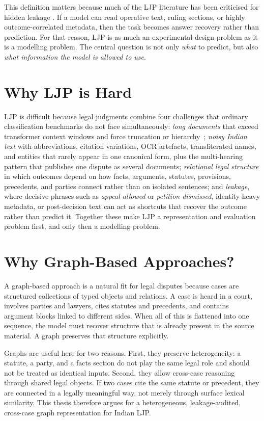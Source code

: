 This definition matters because much of the LJP literature has been criticised for hidden leakage \cite{medvedeva2023doitright}. If a model can read operative text, ruling sections, or highly outcome-correlated metadata, then the task becomes answer recovery rather than prediction. For that reason, LJP is as much an experimental-design problem as it is a modelling problem. The central question is not only \emph{what} to predict, but also \emph{what information the model is allowed to use}. 

\section{Why LJP is Hard}

LJP is difficult because legal judgments combine four challenges that ordinary classification benchmarks do not face simultaneously: \emph{long documents} that exceed transformer context windows and force truncation or hierarchy~\cite{chalkidis2020legalbert, mamakas2022longlegal}; \emph{noisy Indian text} with abbreviations, citation variations, OCR artefacts, transliterated names, and entities that rarely appear in one canonical form, plus the multi-hearing pattern that publishes one dispute as several documents; \emph{relational legal structure} in which outcomes depend on how facts, arguments, statutes, provisions, precedents, and parties connect rather than on isolated sentences; and \emph{leakage}, where decisive phrases such as \emph{appeal allowed} or \emph{petition dismissed}, identity-heavy metadata, or post-decision text can act as shortcuts that recover the outcome rather than predict it. Together these make LJP a representation and evaluation problem first, and only then a modelling problem.

\section{Why Graph-Based Approaches?}

A graph-based approach is a natural fit for legal disputes because cases are structured collections of typed objects and relations. A case is heard in a court, involves parties and lawyers, cites statutes and precedents, and contains argument blocks linked to different sides. When all of this is flattened into one sequence, the model must recover structure that is already present in the source material. A graph preserves that structure explicitly.

Graphs are useful here for two reasons. First, they preserve heterogeneity: a statute, a party, and a facts section do not play the same legal role and should not be treated as identical inputs. Second, they allow cross-case reasoning through shared legal objects. If two cases cite the same statute or precedent, they are connected in a legally meaningful way, not merely through surface lexical similarity. This thesis therefore argues for a heterogeneous, leakage-audited, cross-case graph representation for Indian LJP.

